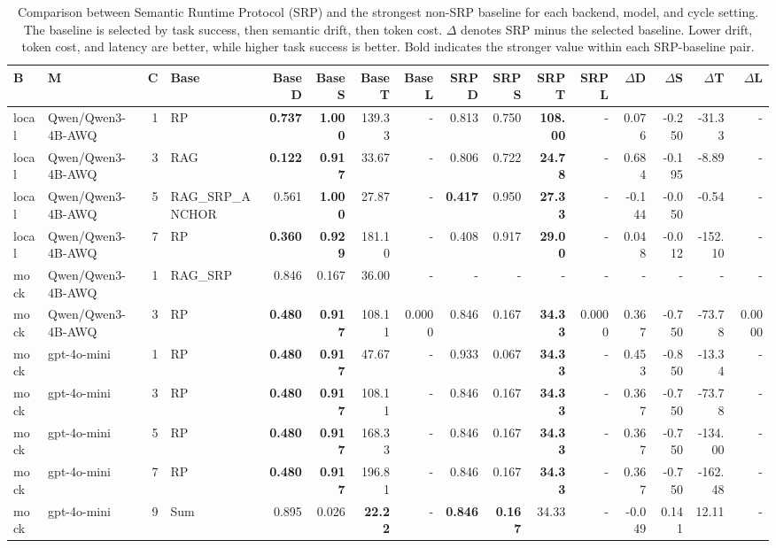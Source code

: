 \begin{table}[t]
\centering
\setlength{\tabcolsep}{2pt}
\scriptsize
\begin{tabular}{llrlrrrrrrrrrrrr}
\toprule
B & M & C & Base & Base D & Base S & Base T & Base L & SRP D & SRP S & SRP T & SRP L & $\Delta$D & $\Delta$S & $\Delta$T & $\Delta$L \\
\midrule
local & Qwen/Qwen3-4B-AWQ & 1 & RP & \textbf{0.737} & \textbf{1.000} & 139.33 & - & 0.813 & 0.750 & \textbf{108.00} & - & 0.076 & -0.250 & -31.33 & - \\
local & Qwen/Qwen3-4B-AWQ & 3 & RAG & \textbf{0.122} & \textbf{0.917} & 33.67 & - & 0.806 & 0.722 & \textbf{24.78} & - & 0.684 & -0.195 & -8.89 & - \\
local & Qwen/Qwen3-4B-AWQ & 5 & RAG_SRP_ANCHOR & 0.561 & \textbf{1.000} & 27.87 & - & \textbf{0.417} & 0.950 & \textbf{27.33} & - & -0.144 & -0.050 & -0.54 & - \\
local & Qwen/Qwen3-4B-AWQ & 7 & RP & \textbf{0.360} & \textbf{0.929} & 181.10 & - & 0.408 & 0.917 & \textbf{29.00} & - & 0.048 & -0.012 & -152.10 & - \\
mock & Qwen/Qwen3-4B-AWQ & 1 & RAG_SRP & 0.846 & 0.167 & 36.00 & - & - & - & - & - & - & - & - & - \\
mock & Qwen/Qwen3-4B-AWQ & 3 & RP & \textbf{0.480} & \textbf{0.917} & 108.11 & 0.0000 & 0.846 & 0.167 & \textbf{34.33} & 0.0000 & 0.367 & -0.750 & -73.78 & 0.0000 \\
mock & gpt-4o-mini & 1 & RP & \textbf{0.480} & \textbf{0.917} & 47.67 & - & 0.933 & 0.067 & \textbf{34.33} & - & 0.453 & -0.850 & -13.34 & - \\
mock & gpt-4o-mini & 3 & RP & \textbf{0.480} & \textbf{0.917} & 108.11 & - & 0.846 & 0.167 & \textbf{34.33} & - & 0.367 & -0.750 & -73.78 & - \\
mock & gpt-4o-mini & 5 & RP & \textbf{0.480} & \textbf{0.917} & 168.33 & - & 0.846 & 0.167 & \textbf{34.33} & - & 0.367 & -0.750 & -134.00 & - \\
mock & gpt-4o-mini & 7 & RP & \textbf{0.480} & \textbf{0.917} & 196.81 & - & 0.846 & 0.167 & \textbf{34.33} & - & 0.367 & -0.750 & -162.48 & - \\
mock & gpt-4o-mini & 9 & Sum & 0.895 & 0.026 & \textbf{22.22} & - & \textbf{0.846} & \textbf{0.167} & 34.33 & - & -0.049 & 0.141 & 12.11 & - \\
\bottomrule
\end{tabular}
\caption{Comparison between Semantic Runtime Protocol (SRP) and the strongest non-SRP baseline for each backend, model, and cycle setting. The baseline is selected by task success, then semantic drift, then token cost. $\Delta$ denotes SRP minus the selected baseline. Lower drift, token cost, and latency are better, while higher task success is better. Bold indicates the stronger value within each SRP-baseline pair.}
\label{tab:srp-camera-ready-table}
\end{table}

